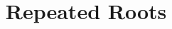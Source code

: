 \documentclass{ximera}
\title[Dig-In:]{Repeated Roots}
\begin{document}
\begin{abstract}
  
\end{abstract}
\maketitle
\end{document}
